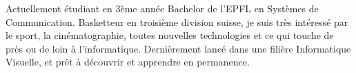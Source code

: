 

\begin{cvparagraph}

Actuellement étudiant en 3ème année Bachelor de l'EPFL en Systèmes de Communication. Basketteur en troisième division suisse, je suis très intéressé par le sport, la cinématographie, toutes nouvelles technologies et ce qui touche de près ou de loin à l'informatique. Dernièrement lancé dans une filière Informatique Visuelle, et prêt à découvrir et apprendre en permanence.
\end{cvparagraph}
